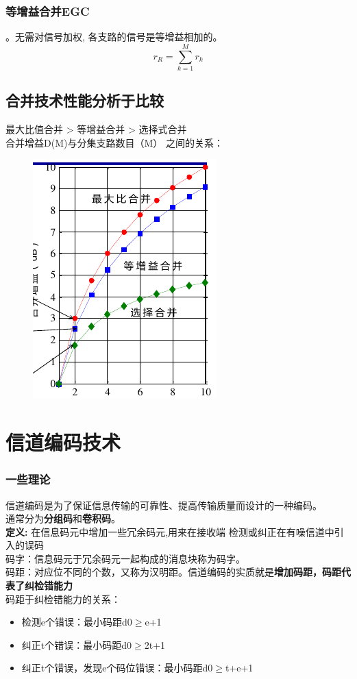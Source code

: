 \subsubsection{等增益合并EGC}
。无需对信号加权,
各支路的信号是等增益相加的。
\begin{equation}\label{key}
r_R = \sum_{k=1}^{M}r_k
\end{equation}
\subsection{合并技术性能分析于比较}
最大比值合并 > 等增益合并 > 选择式合并\\
合并增益D(M)与分集支路数目（M）
之间的关系：
\begin{figure}[H]
	\centering
	\includegraphics[width=0.7\linewidth]{figures/hebingbijiao.png}
	\caption{}
	\label{fig:}
\end{figure}
\section{信道编码技术}
\subsubsection{一些理论}
信道编码是为了保证信息传输的可靠性、提高传输质量而设计的一种编码。\\
通常分为\textbf{分组码}和\textbf{卷积码}。\\
\textbf{定义:} 在信息码元中增加一些冗余码元,用来在接收端
检测或纠正在有噪信道中引入的误码\\
码字：信息码元于冗余码元一起构成的消息块称为码字。\\
码距：对应位不同的个数，又称为汉明距。信道编码的实质就是\textbf{增加码距，码距代表了纠检错能力}\\
码距于纠检错能力的关系：
\begin{itemize}
	\item 检测e个错误：最小码距d0$\ge$e+1
	\item 纠正t个错误：最小码距d0$\ge$2t+1
	\item 纠正t个错误，发现e个码位错误：最小码距d0$\ge$t+e+1
\end{itemize}
